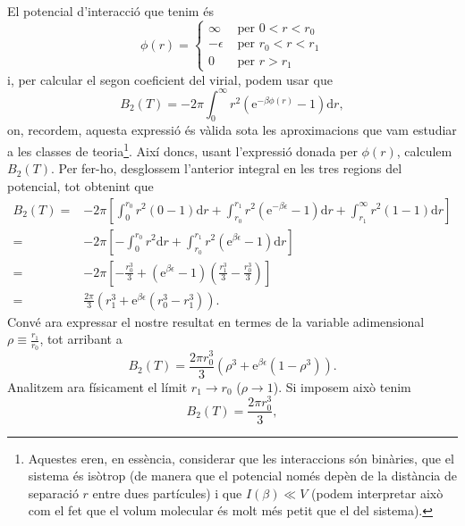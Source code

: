\documentclass[a4paper, 10pt]{article}
\begin{document}
El potencial d'interacció que tenim és 
\begin{equation}
	\phi(r) =
	\begin{cases}
		\infty & \text{ per } 0 < r < r_0 \\
		-\epsilon & \text{ per } r_0 < r < r_1 \\
		0 & \text{ per } r > r_1
	\end{cases}
\end{equation}
i, per calcular el segon coeficient del virial, podem usar que
\begin{equation}
	B_2(T) = -2\pi \int_0^{\infty}r^2(\mathrm{e}^{-\beta \phi(r)}-1)\mathrm{d}r,
\end{equation}
on, recordem, aquesta expressió és vàlida sota les aproximacions que vam estudiar a les classes de teoria\footnote{Aquestes eren, en essència, considerar que les interaccions són binàries, que el sistema és isòtrop (de manera que el potencial només depèn de la distància de separació $r$ entre dues partícules) i que $I(\beta) \ll V$ (podem interpretar això com el fet que el volum molecular és molt més petit que el del sistema).}. Així doncs, usant l'expressió donada per $\phi(r)$, calculem $B_2(T)$. Per fer-ho, desglossem l'anterior integral en les tres regions del potencial, tot obtenint que
\begin{align*}
	B_2(T) = & -2\pi \left[\int_0^{r_0}r^2(0-1)\mathrm{d}r + \int_{r_0}^{r_1}r^2(\mathrm{e}^{-\beta \epsilon}-1)\mathrm{d}r+\int_{r_1}^{\infty} r^2(1-1)\mathrm{d}r\right]\\
	= & -2\pi \left[-\int_{0}^{r_0}r^2\mathrm{d}r+\int_{r_0}^{r_1}r^2(\mathrm{e}^{\beta \epsilon}-1)\mathrm{d}r\right] \\
	= & -2\pi\left[-\frac{r_0^3}{3}+(\mathrm{e}^{\beta \epsilon}-1)\left(\frac{r_1^3}{3}-\frac{r_0^3}{3}\right)\right] \\
	= & \frac{2\pi}{3}\left(r_1^3+\mathrm{e}^{\beta \epsilon}(r_0^3-r_1^3)\right).
\end{align*}
Convé ara expressar el nostre resultat en termes de la variable adimensional $\rho \equiv \frac{r_1}{r_0}$, tot arribant a
\begin{equation}
	\boxed{B_2(T) = \frac{2\pi r_0^3}{3}\left(\rho^3+\mathrm{e}^{\beta \epsilon}(1-\rho^3)\right)} \label{eq:3}.
\end{equation}
Analitzem ara físicament el límit $r_1 \rightarrow r_0$ ($\rho \rightarrow 1$). Si imposem això tenim 
\begin{equation}
	B_2(T) = \frac{2\pi r_0^3}{3},
\end{equation}
\end{document}
